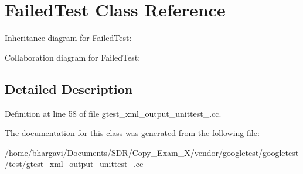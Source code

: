 \hypertarget{class_failed_test}{}\section{Failed\+Test Class Reference}
\label{class_failed_test}


Inheritance diagram for Failed\+Test\+:


Collaboration diagram for Failed\+Test\+:


\subsection{Detailed Description}


Definition at line 58 of file gtest\+\_\+xml\+\_\+output\+\_\+unittest\+\_\+.\+cc.



The documentation for this class was generated from the following file\+:\begin{DoxyCompactItemize}
\item 
/home/bhargavi/\+Documents/\+S\+D\+R/\+Copy\+\_\+\+Exam\+\_\+X/vendor/googletest/googletest/test/\hyperlink{gtest__xml__output__unittest___8cc}{gtest\+\_\+xml\+\_\+output\+\_\+unittest\+\_\+.\+cc}\end{DoxyCompactItemize}
